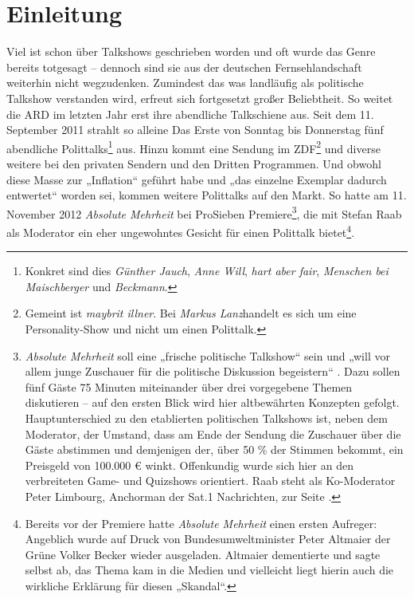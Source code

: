 \chapter{Einleitung}

Viel ist schon über Talkshows geschrieben worden und oft wurde das Genre bereits totgesagt – dennoch sind sie aus der deutschen Fernsehlandschaft weiterhin nicht wegzudenken. Zumindest das was landläufig als politische Talkshow verstanden wird, erfreut sich fortgesetzt großer Beliebtheit. So weitet die ARD im letzten Jahr erst ihre abendliche Talkschiene aus. Seit dem 11. September 2011 strahlt so alleine Das Erste von Sonntag bis Donnerstag fünf abendliche Polittalks\footnote{Konkret sind dies \textit{Günther Jauch}, \textit{Anne Will}, \textit{hart aber fair}, \textit{Menschen bei Maischberger} und \textit{Beckmann}.} aus. Hinzu kommt eine Sendung im ZDF\footnote{Gemeint ist \textit{maybrit illner}. Bei \textit{Markus Lanz}handelt es sich um eine Personality-Show und nicht um einen Polittalk.} und diverse weitere bei den privaten Sendern und den Dritten Programmen. Und obwohl diese Masse zur „Inflation“ \parencite[116]{gaeblerUndUnserenTaeglichen2011} geführt habe und „das einzelne Exemplar dadurch entwertet“ \parencite[116]{gaeblerUndUnserenTaeglichen2011} worden sei, kommen weitere Polittalks auf den Markt. So hatte am 11. November 2012 \textit{Absolute Mehrheit} bei ProSieben Premiere\footnote{\textit{Absolute Mehrheit} soll eine „frische politische Talkshow“ sein und „will vor allem junge Zuschauer für die politische Diskussion begeistern“ \parencite{prosiebenShowAbsoluteMehrheito.J.}. Dazu sollen fünf Gäste 75 Minuten miteinander über drei vorgegebene Themen diskutieren – auf den ersten Blick wird hier altbewährten Konzepten gefolgt. Hauptunterschied zu den etablierten politischen Talkshows ist, neben dem Moderator, der Umstand, dass am Ende der Sendung die Zuschauer über die Gäste abstimmen und demjenigen der, über 50 \% der Stimmen bekommt, ein Preisgeld von 100.000 € winkt. Offenkundig wurde sich hier an den verbreiteten Game- und Quizshows orientiert. Raab steht als Ko-Moderator Peter Limbourg, Anchorman der Sat.1 Nachrichten, zur Seite \parencite{prosiebenShowAbsoluteMehrheito.J.}.}, die mit Stefan Raab als Moderator ein eher ungewohntes Gesicht für einen Polittalk bietet\footnote{Bereits vor der Premiere hatte \textit{Absolute Mehrheit} einen ersten Aufreger: Angeblich wurde auf Druck von Bundesumweltminister Peter Altmaier der Grüne Volker Becker wieder ausgeladen. Altmaier dementierte und sagte selbst ab, das Thema kam in die Medien und vielleicht liegt hierin auch die wirkliche Erklärung für diesen „Skandal“.}.

